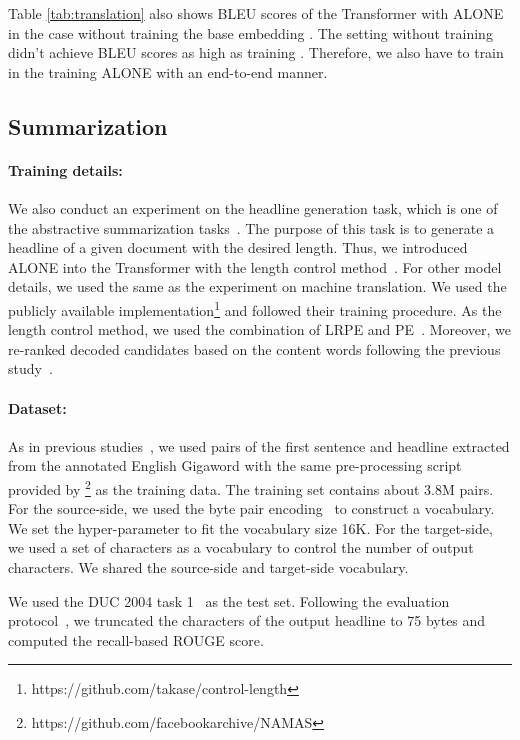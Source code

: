 \documentclass{article}
\begin{document}
Table \ref{tab:translation} also shows BLEU scores of the Transformer with ALONE in the case without training the base embedding .
The setting without training  didn't achieve BLEU scores as high as training .
Therefore, we also have to train  in the training ALONE with an end-to-end manner.


\subsection{Summarization}\label{sec:summarization}
\paragraph{Training details:}
We also conduct an experiment on the headline generation task, which is one of the abstractive summarization tasks~\cite{rush-chopra-weston:2015:EMNLP,takase-okazaki-2019-positional}.
The purpose of this task is to generate a headline of a given document with the desired length.
Thus, we introduced ALONE into the Transformer with the length control method~\cite{takase-okazaki-2019-positional}.
For other model details, we used the same as the experiment on machine translation.
We used the publicly available implementation\footnote{https://github.com/takase/control-length} and followed their training procedure.
As the length control method, we used the combination of LRPE and PE~\cite{takase-okazaki-2019-positional}.
Moreover, we re-ranked decoded candidates based on the content words following the previous study~\cite{takase-okazaki-2019-positional}.


\paragraph{Dataset:}
As in previous studies~\cite{rush-chopra-weston:2015:EMNLP,takase-okazaki-2019-positional}, we used pairs of the first sentence and headline extracted from the annotated English Gigaword with the same pre-processing script provided by \citet{rush-chopra-weston:2015:EMNLP}\footnote{https://github.com/facebookarchive/NAMAS} as the training data.
The training set contains about 3.8M pairs.
For the source-side, we used the byte pair encoding~\cite{sennrich-etal-2016-neural} to construct a vocabulary.
We set the hyper-parameter to fit the vocabulary size 16K.
For the target-side, we used a set of characters as a vocabulary to control the number of output characters.
We shared the source-side and target-side vocabulary.

We used the DUC 2004 task 1~\cite{Over:2007:DC:1284916.1285157} as the test set.
Following the evaluation protocol~\cite{Over:2007:DC:1284916.1285157}, we truncated the characters of the output headline to 75 bytes and computed the recall-based ROUGE score.
\end{document}
